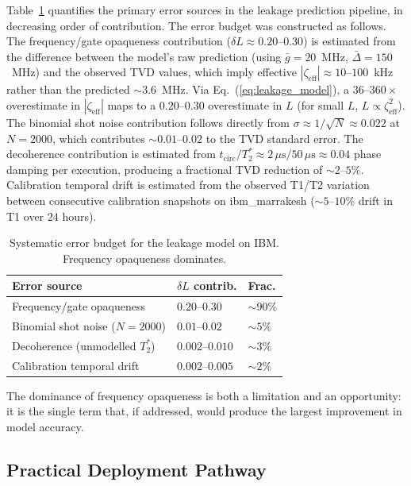 \documentclass[ASNA,twocolumn]{USG}
\begin{document}
Table~\ref{tab:errorbudget} quantifies the primary error sources in the leakage prediction pipeline, in decreasing order of contribution. The error budget was constructed as follows. The frequency/gate opaqueness contribution ($\delta L \approx 0.20$--$0.30$) is estimated from the difference between the model's raw prediction (using $\bar{g} = 20$~MHz, $\bar{\Delta} = 150$~MHz) and the observed TVD values, which imply effective $|\zeta_{\mathrm{eff}}| \approx 10$--$100$~kHz rather than the predicted $\sim 3.6$~MHz. Via Eq.~(\ref{eq:leakage_model}), a $36$--$360\times$ overestimate in $|\zeta_{\mathrm{eff}}|$ maps to a $0.20$--$0.30$ overestimate in $L$ (for small $L$, $L \propto \zeta_{\mathrm{eff}}^2$). The binomial shot noise contribution follows directly from $\sigma \approx 1/\sqrt{N} \approx 0.022$ at $N = 2000$, which contributes $\sim 0.01$--$0.02$ to the TVD standard error. The decoherence contribution is estimated from $t_{\mathrm{circ}}/T_2^* \approx 2\,\mu\mathrm{s}/50\,\mu\mathrm{s} \approx 0.04$ phase damping per execution, producing a fractional TVD reduction of $\sim 2$--$5\%$. Calibration temporal drift is estimated from the observed T1/T2 variation between consecutive calibration snapshots on ibm\_marrakesh ($\sim 5$--$10\%$ drift in T1 over $24$ hours).

\begin{table}[t]
\centering
\caption{Systematic error budget for the leakage model on IBM. Frequency opaqueness dominates.}
\label{tab:errorbudget}
\scriptsize
\begin{tabular}{p{3.2cm}p{1.8cm}p{1.3cm}}
\toprule
Error source & $\delta L$ contrib. & Frac. \\
\midrule
Frequency/gate opaqueness & $0.20$--$0.30$ & $\sim 90\%$ \\
Binomial shot noise ($N{=}2000$) & $0.01$--$0.02$ & $\sim 5\%$ \\
Decoherence (unmodelled $T_2^*$) & $0.002$--$0.010$& $\sim 3\%$ \\
Calibration temporal drift & $0.002$--$0.005$& $\sim 2\%$ \\
\bottomrule
\end{tabular}
\end{table}

The dominance of frequency opaqueness is both a limitation and an opportunity: it is the single term that, if addressed, would produce the largest improvement in model accuracy.

\subsection{Practical Deployment Pathway}
\end{document}
